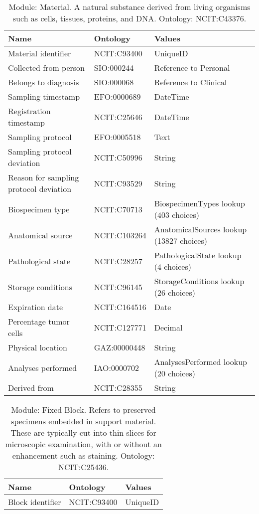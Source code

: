 \documentclass{article}
\begin{document}
\begin{table}[htb]
\begin{tabular}{lll}
Name & Ontology & Values \\
\hline
Material identifier & NCIT:C93400 & UniqueID \\
Collected from person & SIO:000244 & Reference to Personal \\
Belongs to diagnosis & SIO:000068 & Reference to Clinical \\
Sampling timestamp & EFO:0000689 & DateTime \\
Registration timestamp & NCIT:C25646 & DateTime \\
Sampling protocol & EFO:0005518 & Text \\
Sampling protocol deviation & NCIT:C50996 & String \\
Reason for sampling protocol deviation & NCIT:C93529 & String \\
Biospecimen type & NCIT:C70713 & BiospecimenTypes lookup (403 choices) \\
Anatomical source & NCIT:C103264 & AnatomicalSources lookup (13827 choices) \\
Pathological state & NCIT:C28257 & PathologicalState lookup (4 choices) \\
Storage conditions & NCIT:C96145 & StorageConditions lookup (26 choices) \\
Expiration date & NCIT:C164516 & Date \\
Percentage tumor cells & NCIT:C127771 & Decimal \\
Physical location & GAZ:00000448 & String \\
Analyses performed & IAO:0000702 & AnalysesPerformed lookup (20 choices) \\
Derived from & NCIT:C28355 & String \\
\hline
\end{tabular}
\caption[Module: Material]{\label{table:table7} Module: Material. A natural substance derived from living organisms such as cells, tissues, proteins, and DNA. Ontology: NCIT:C43376. }
\end{table}

\begin{table}[htb]
\begin{tabular}{lll}
Name & Ontology & Values \\
\hline
Block identifier & NCIT:C93400 & UniqueID \\
\hline
\end{tabular}
\caption[Module: Fixed Block]{\label{table:table8} Module: Fixed Block. Refers to preserved specimens embedded in support material. These are typically cut into thin slices for microscopic examination, with or without an enhancement such as staining. Ontology: NCIT:C25436. }
\end{table}
\end{document}
